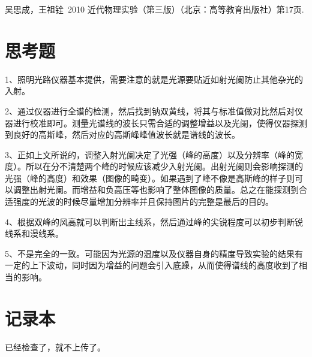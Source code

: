 \documentclass[aps,pre,12pt,preprint,onecolumn,showpacs,showkeys,UTF8]{revtex4-1}
\begin{document}
\begin{thebibliography}{}
	 吴思成，王祖铨~2010 近代物理实验（第三版）（北京：高等教育出版社）第17页.%
%
\end{thebibliography}

\clearpage
\appendix
\section{思考题}
1、照明光路仪器基本提供，需要注意的就是光源要贴近如射光阑防止其他杂光的入射。

2、通过仪器进行全谱的检测，然后找到钠双黄线，将其与标准值做对比然后对仪器进行校准即可。测量光谱线的波长只需合适的调整增益以及光阑，使得仪器探测到良好的高斯峰，然后对应的高斯峰峰值波长就是谱线的波长。

3、正如上文所说的，调整入射光阑决定了光强（峰的高度）以及分辨率（峰的宽度）。所以在分不清楚两个峰的时候应该减少入射光阑。出射光阑则会影响探测的光强（峰的高度）和效果（图像的畸变）。如果遇到了峰不像是高斯峰的样子则可以调整出射光阑。而增益和负高压等也影响了整体图像的质量。总之在能探测到合适强度的光波的时候尽量增加分辨率并且保持图片的完整是最后的目的。

4、根据双峰的风高就可以判断出主线系，然后通过峰的尖锐程度可以初步判断锐线系和漫线系。

5、不是完全的一致。可能因为光源的温度以及仪器自身的精度导致实验的结果有一定的上下波动，同时因为增益的问题会引入底躁，从而使得谱线的高度收到了相当的影响。

\section{记录本}
已经检查了，就不上传了。
\end{document}
